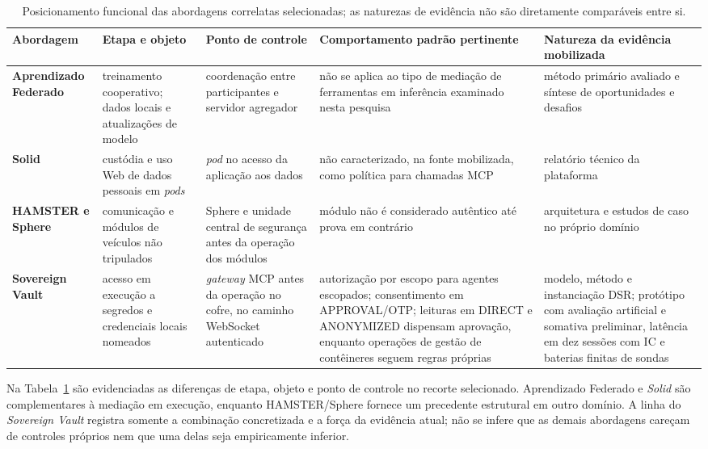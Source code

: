 \documentclass[12pt,openright,twoside,a4paper,english,brazil]{abntex2}
\begin{document}
\begin{table}[!htbp]
\centering
\scriptsize
\caption{Posicionamento funcional das abordagens correlatas selecionadas; as naturezas de evidência não são diretamente comparáveis entre si.}
\label{tab:posicionamento-correlatos}
\begin{tabularx}{\textwidth}{>{\raggedright\arraybackslash\bfseries}p{}>{\raggedright\arraybackslash}p{}>{\raggedright\arraybackslash}p{}>{\raggedright\arraybackslash}p{}X}
\toprule Abordagem & Etapa e objeto & Ponto de controle & Comportamento padrão pertinente & Natureza da evidência mobilizada \\ \midrule
Aprendizado Federado \cite{mcmahan2017,mammen2021} & treinamento cooperativo; dados locais e atualizações de modelo & coordenação entre participantes e servidor agregador & não se aplica ao tipo de mediação de ferramentas em inferência examinado nesta pesquisa & método primário avaliado e síntese de oportunidades e desafios \\
Solid \cite{sambra2016} & custódia e uso Web de dados pessoais em \textit{pods} & \textit{pod} no acesso da aplicação aos dados & não caracterizado, na fonte mobilizada, como política para chamadas MCP & relatório técnico da plataforma \\
HAMSTER e Sphere \cite{pigatto2016} & comunicação e módulos de veículos não tripulados & Sphere e unidade central de segurança antes da operação dos módulos & módulo não é considerado autêntico até prova em contrário & arquitetura e estudos de caso no próprio domínio \\
Sovereign Vault & acesso em execução a segredos e credenciais locais nomeados & \textit{gateway} MCP antes da operação no cofre, no caminho WebSocket autenticado & autorização por escopo para agentes escopados; consentimento em APPROVAL/OTP; leituras em DIRECT e ANONYMIZED dispensam aprovação, enquanto operações de gestão de contêineres seguem regras próprias & modelo, método e instanciação DSR; protótipo com avaliação artificial e somativa preliminar, latência em dez sessões com IC e baterias finitas de sondas \\
\bottomrule
\end{tabularx}
\end{table}

Na Tabela~\ref{tab:posicionamento-correlatos} são evidenciadas as diferenças de etapa, objeto e ponto de controle no recorte selecionado. Aprendizado Federado e \textit{Solid} são complementares à mediação em execução, enquanto HAMSTER/Sphere fornece um precedente estrutural em outro domínio. A linha do \textit{Sovereign Vault} registra somente a combinação concretizada e a força da evidência atual; não se infere que as demais abordagens careçam de controles próprios nem que uma delas seja empiricamente inferior.
\end{document}
